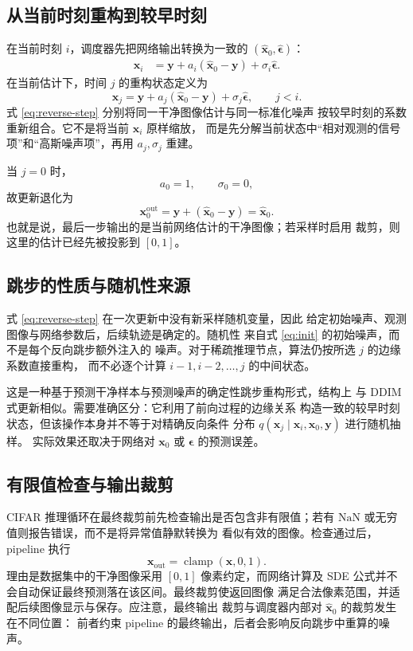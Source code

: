 \documentclass[UTF8,a4paper,12pt]{ctexart}
\begin{document}
\subsection{从当前时刻重构到较早时刻}

在当前时刻 \(i\)，调度器先把网络输出转换为一致的
\((\widehat{\bm{x}}_0,\widehat{\bm{\epsilon}})\)：
\begin{align}
  \bm{x}_i
  &=\bm{y}
    +a_i(\widehat{\bm{x}}_0-\bm{y})
    +\sigma_i\widehat{\bm{\epsilon}}.
  \label{eq:current-reconstruction}
\end{align}
在当前估计下，时间 \(j\) 的重构状态定义为
\begin{equation}
  \bm{x}_j
  =
  \bm{y}
  +a_j(\widehat{\bm{x}}_0-\bm{y})
  +\sigma_j\widehat{\bm{\epsilon}},
  \qquad j<i.
  \label{eq:reverse-step}
\end{equation}
式 \eqref{eq:reverse-step} 分别将同一干净图像估计与同一标准化噪声
按较早时刻的系数重新组合。它不是将当前 \(\bm{x}_i\) 原样缩放，
而是先分解当前状态中“相对观测的信号项”和“高斯噪声项”，再用
\(a_j,\sigma_j\) 重建。

当 \(j=0\) 时，
\[
  a_0=1,\qquad \sigma_0=0,
\]
故更新退化为
\[
  \bm{x}_0^{\mathrm{out}}
  =\bm{y}+(\widehat{\bm{x}}_0-\bm{y})
  =\widehat{\bm{x}}_0.
\]
也就是说，最后一步输出的是当前网络估计的干净图像；若采样时启用
裁剪，则这里的估计已经先被投影到 \([0,1]\)。

\subsection{跳步的性质与随机性来源}

式 \eqref{eq:reverse-step} 在一次更新中没有新采样随机变量，因此
给定初始噪声、观测图像与网络参数后，后续轨迹是确定的。随机性
来自式 \eqref{eq:init} 的初始噪声，而不是每个反向跳步额外注入的
噪声。对于稀疏推理节点，算法仍按所选 \(j\) 的边缘系数直接重构，
而不必逐个计算 \(i-1,i-2,\ldots,j\) 的中间状态。

这是一种基于预测干净样本与预测噪声的确定性跳步重构形式，结构上
与 DDIM 式更新相似。需要准确区分：它利用了前向过程的边缘关系
构造一致的较早时刻状态，但该操作本身并不等于对精确反向条件
分布 \(q(\bm{x}_j\mid\bm{x}_i,\bm{x}_0,\bm{y})\) 进行随机抽样。
实际效果还取决于网络对 \(\bm{x}_0\) 或 \(\bm{\epsilon}\) 的预测误差。

\subsection{有限值检查与输出裁剪}

CIFAR 推理循环在最终裁剪前先检查输出是否包含非有限值；若有
\(\mathrm{NaN}\) 或无穷值则报告错误，而不是将异常值静默转换为
看似有效的图像。检查通过后，pipeline 执行
\[
  \bm{x}_{\mathrm{out}}=
  \operatorname{clamp}(\bm{x},0,1).
\]
理由是数据集中的干净图像采用 \([0,1]\) 像素约定，而网络计算及
SDE 公式并不会自动保证最终预测落在该区间。最终裁剪使返回图像
满足合法像素范围，并适配后续图像显示与保存。应注意，最终输出
裁剪与调度器内部对 \(\widehat{\bm{x}}_0\) 的裁剪发生在不同位置：
前者约束 pipeline 的最终输出，后者会影响反向跳步中重算的噪声。
\end{document}
